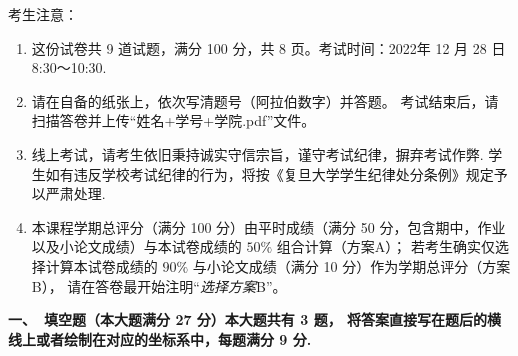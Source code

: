 考生注意：
\begin{enumerate}
\item 这份试卷共 9 道试题，满分 100 分，共 8 页。考试时间：2022年 12 月 28 日 8:30～10:30.
\item 请在自备的纸张上，依次写清题号（阿拉伯数字）并答题。
考试结束后，请扫描答卷并上传``姓名+学号+学院.pdf''文件。
\item 线上考试，请考生依旧秉持诚实守信宗旨，谨守考试纪律，摒弃考试作弊.
学生如有违反学校考试纪律的行为，将按《复旦大学学生纪律处分条例》规定予以严肃处理.
\item 本课程学期总评分（满分 100 分）由平时成绩（满分 50 分，包含期中，作业以及小论文成绩）与本试卷成绩的 $50 \%$ 组合计算（方案A）；
若考生确实仅选择计算本试卷成绩的 $90 \%$ 与小论文成绩（满分 10 分）作为学期总评分（方案B），
请在答卷最开始注明``\textit{选择方案}B''。
\end{enumerate}
\textbf{一、\ 填空题（本大题满分 27 分）本大题共有 3 题，
将答案直接写在题后的横线上或者绘制在对应的坐标系中，每题满分 9 分.}
